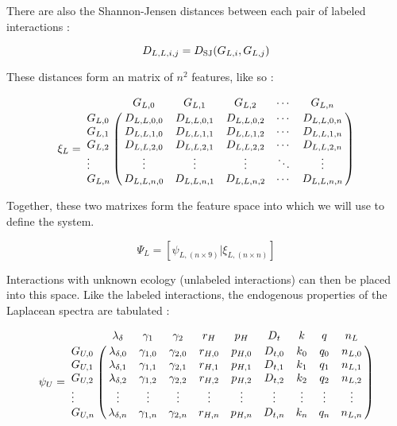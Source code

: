 \noindent There are also the Shannon-Jensen distances between each pair of labeled interactions :

\begin{equation}
    D_{L,L,i,j} = D_{\rm SJ}( G_{L,i}, G_{L,j} )
\end{equation}

\noindent These distances form an matrix of $n^2$ features, like so :

\begin{equation}
\xi_L =
\bordermatrix{
        & G_{L,0}     & G_{L,1}     & G_{L,2}     & \cdots & G_{L,n}     \cr
G_{L,0} & D_{L,L,0,0} & D_{L,L,0,1} & D_{L,L,0,2} & \cdots & D_{L,L,0,n} \cr
G_{L,1} & D_{L,L,1,0} & D_{L,L,1,1} & D_{L,L,1,2} & \cdots & D_{L,L,1,n} \cr
G_{L,2} & D_{L,L,2,0} & D_{L,L,2,1} & D_{L,L,2,2} & \cdots & D_{L,L,2,n} \cr
\vdots  & \vdots      & \vdots      & \vdots      & \ddots & \vdots      \cr
G_{L,n} & D_{L,L,n,0} & D_{L,L,n,1} & D_{L,L,n,2} & \cdots & D_{L,L,n,n} \cr
}
\end{equation}

\noindent Together, these two matrixes form the feature space into which we will use to define the system.

\begin{equation}
    \Psi_{L} = \left[ \psi_{L,(n \times 9)} | \xi_{L,(n \times n)} \right]
\end{equation}

Interactions with unknown ecology (unlabeled interactions) can then be placed into this space. Like the labeled interactions, the endogenous properties of the Laplacean spectra are tabulated :

\begin{equation}
\psi_U =
\bordermatrix{
        & \lambda_{\delta}   & \gamma_{1}   & \gamma_{2}   & r_{H}   & p_{H}   & D_{t}   & k      & q      & n_{L}   \cr
G_{U,0} & \lambda_{\delta,0} & \gamma_{1,0} & \gamma_{2,0} & r_{H,0} & p_{H,0} & D_{t,0} & k_{0}  & q_{0}  & n_{L,0} \cr
G_{U,1} & \lambda_{\delta,1} & \gamma_{1,1} & \gamma_{2,1} & r_{H,1} & p_{H,1} & D_{t,1} & k_{1}  & q_{1}  & n_{L,1} \cr
G_{U,2} & \lambda_{\delta,2} & \gamma_{1,2} & \gamma_{2,2} & r_{H,2} & p_{H,2} & D_{t,2} & k_{2}  & q_{2}  & n_{L,2} \cr
\vdots  & \vdots             & \vdots       & \vdots       & \vdots  & \vdots  & \vdots  & \vdots & \vdots & \vdots  \cr 
G_{U,n} & \lambda_{\delta,n} & \gamma_{1,n} & \gamma_{2,n} & r_{H,n} & p_{H,n} & D_{t,n} & k_{n}  & q_{n}  & n_{L,n} \cr
}
\end{equation}

